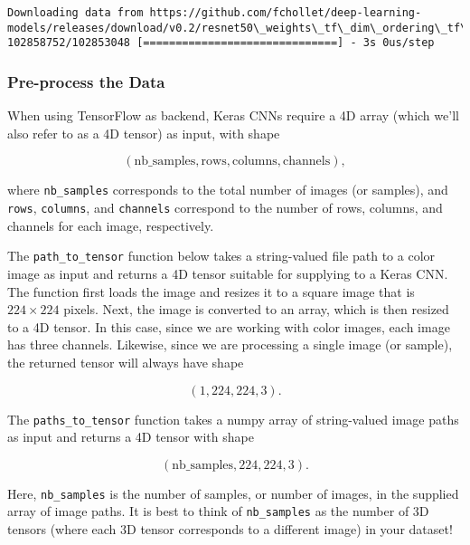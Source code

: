 \documentclass[11pt]{article}
\begin{document}
    \begin{Verbatim}[commandchars=\\\{\}]
Downloading data from https://github.com/fchollet/deep-learning-models/releases/download/v0.2/resnet50\_weights\_tf\_dim\_ordering\_tf\_kernels.h5
102858752/102853048 [==============================] - 3s 0us/step

    \end{Verbatim}

    \hypertarget{pre-process-the-data}{%
\subsubsection{Pre-process the Data}\label{pre-process-the-data}}

When using TensorFlow as backend, Keras CNNs require a 4D array (which
we'll also refer to as a 4D tensor) as input, with shape

\[
(\text{nb_samples}, \text{rows}, \text{columns}, \text{channels}),
\]

where \texttt{nb\_samples} corresponds to the total number of images (or
samples), and \texttt{rows}, \texttt{columns}, and \texttt{channels}
correspond to the number of rows, columns, and channels for each image,
respectively.

The \texttt{path\_to\_tensor} function below takes a string-valued file
path to a color image as input and returns a 4D tensor suitable for
supplying to a Keras CNN. The function first loads the image and resizes
it to a square image that is \(224 \times 224\) pixels. Next, the image
is converted to an array, which is then resized to a 4D tensor. In this
case, since we are working with color images, each image has three
channels. Likewise, since we are processing a single image (or sample),
the returned tensor will always have shape

\[
(1, 224, 224, 3).
\]

The \texttt{paths\_to\_tensor} function takes a numpy array of
string-valued image paths as input and returns a 4D tensor with shape

\[
(\text{nb_samples}, 224, 224, 3).
\]

Here, \texttt{nb\_samples} is the number of samples, or number of
images, in the supplied array of image paths. It is best to think of
\texttt{nb\_samples} as the number of 3D tensors (where each 3D tensor
corresponds to a different image) in your dataset!
\end{document}
